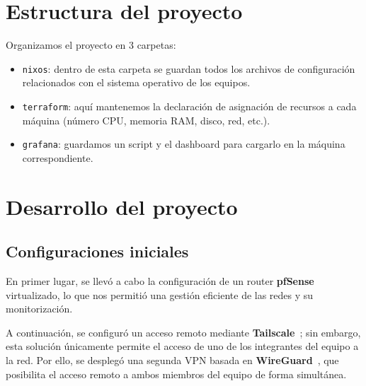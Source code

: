 \documentclass[a4paper, 11pt]{article}
\begin{document}
\section{Estructura del proyecto}

Organizamos el proyecto en 3 carpetas:


\begin{itemize}
  \item \texttt{nixos}: dentro de esta carpeta se guardan todos los archivos de 
    configuración relacionados con el sistema operativo de los equipos.
  \item \texttt{terraform}: aquí mantenemos la declaración de asignación de 
    recursos a cada máquina (número CPU, memoria RAM, disco, red, etc.).
  \item \texttt{grafana}: guardamos un script y el dashboard para cargarlo en la 
    máquina correspondiente. 
\end{itemize}

\section{Desarrollo del proyecto}

\subsection{Configuraciones iniciales}

En primer lugar, se llevó a cabo la configuración de un router \textbf{pfSense}~\cite{pfsense} 
virtualizado, lo que nos permitió una gestión eficiente de las redes y su monitorización.

A continuación, se configuró un acceso remoto mediante \textbf{Tailscale}~\cite{tailscale}; 
sin embargo, esta solución únicamente permite el acceso de uno de los integrantes del equipo 
a la red. Por ello, se desplegó una segunda VPN basada en \textbf{WireGuard}~\cite{wireguard}, 
que posibilita el acceso remoto a ambos miembros del equipo de forma simultánea.
\end{document}
